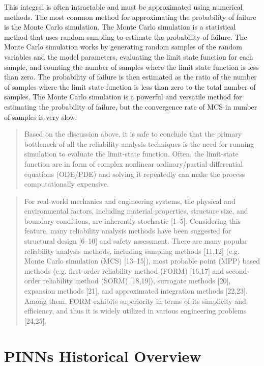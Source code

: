 This integral is often intractable and must be approximated using numerical methods. The most common method for approximating the probability of failure is the Monte Carlo simulation. The Monte Carlo simulation is a statistical method that uses random sampling to estimate the probability of failure. The Monte Carlo simulation works by generating random samples of the random variables and the model parameters, evaluating the limit state function for each sample, and counting the number of samples where the limit state function is less than zero. The probability of failure is then estimated as the ratio of the number of samples where the limit state function is less than zero to the total number of samples. The Monte Carlo simulation is a powerful and versatile method for estimating the probability of failure, but the convergence rate of MCS in number of samples is very slow. 

\begin{quotation}
    Based on the discussion above, it is safe to conclude that the primary bottleneck of all the reliability analysis techniques is the need for running simulation to evaluate the limit-state function. Often, the limit-state function are in form of complex nonlinear ordinary/partial differential equations (ODE/PDE) and solving it repeatedly can make the process computationally expensive. \citep{chakraborty2020simulationfreereliabilityanalysis}
\end{quotation}

\begin{quotation}
For real-world mechanics and engineering systems, the physical and environmental factors, including material properties, structure size, and boundary conditions, are inherently stochastic [1–5]. Considering this feature, many reliability analysis methods have been suggested for structural design [6–10] and safety assessment. There are many popular reliability analysis methods, including sampling methods [11,12] (e.g. Monte Carlo simulation (MCS) [13–15]), most probable point (MPP) based methods (e.g. first-order reliability method (FORM) [16,17] and second-order reliability method (SORM) [18,19]), surrogate methods [20], expansion methods [21], and approximated integration methods [22,23]. Among them, FORM exhibits superiority in terms of its simplicity and efficiency, and thus it is widely utilized in various engineering problems [24,25]. \citep{PINN-FORM}
\end{quotation}

\section{PINNs Historical Overview}
\label{sec:historical-overview}


